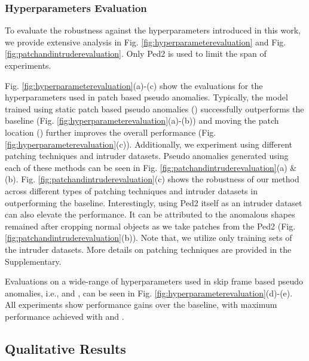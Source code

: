 \documentclass{bmvc2k}
\begin{document}
\vspace{-2mm}
\subsubsection{Hyperparameters Evaluation}
\label{subsubsec:hyperparameterseval}
To evaluate the robustness against the hyperparameters introduced in this work, we provide extensive analysis in Fig. \ref{fig:hyperparameterevaluation} and Fig. \ref{fig:patchandintruderevaluation}. Only Ped2 is used to limit the span of experiments. 

Fig. \ref{fig:hyperparameterevaluation}(a)-(c) show the evaluations for the hyperparameters used in patch based pseudo anomalies. 
Typically, the model trained using static patch based pseudo anomalies () successfully outperforms the baseline (Fig. \ref{fig:hyperparameterevaluation}(a)-(b)) and moving the patch location  () further improves the overall performance (Fig. \ref{fig:hyperparameterevaluation}(c)).
Additionally, we experiment using different patching techniques and intruder datasets. Pseudo anomalies generated using each of these methods can be seen in Fig. \ref{fig:patchandintruderevaluation}(a) \& (b). Fig. \ref{fig:patchandintruderevaluation}(c) shows the robustness of our method across different types of patching techniques and intruder datasets in outperforming the baseline. Interestingly, using Ped2 itself as an intruder dataset can also elevate the performance. It can be attributed to the anomalous shapes remained after cropping normal objects as we take patches from the Ped2 (Fig. \ref{fig:patchandintruderevaluation}(b)). Note that, we utilize only training sets of the intruder datasets. More details on patching techniques are provided in the Supplementary. 

Evaluations on a wide-range of hyperparameters used in skip frame based pseudo anomalies, i.e.,  and , can be seen in Fig. \ref{fig:hyperparameterevaluation}(d)-(e). All experiments show performance gains over the baseline, with maximum performance achieved with  and .



\vspace{-3mm}
\subsection{Qualitative Results}
\label{subsec:qualitative}
\end{document}
